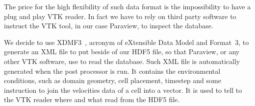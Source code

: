 The price for the high flexibility of such data format is the impossibility to have a plug and play VTK reader. In fact we have to rely on third party software to instruct the VTK tool, in our case Paraview, to inspect the database. \par
We decide to use XDMF3~\cite{xdmf3}, acronym of eXtensible Data Model and Format~3, to generate an XML file to put beside of our HDF5 file, so that Paraview, or any other VTK software, use to read the database.
Such XML file is automatically generated when the post processor is run. It contains the environmental conditions, such as domain geometry, cell placement, timestep and some instruction to join the velocities data of a cell into a vector. It is used to tell to the VTK reader where and what read from the HDF5 file.

